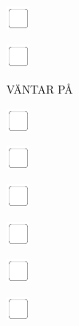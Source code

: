 \documentclass[11pt,titlepage]{article}
\begin{document}
\vspace{10mm}

\noindent
\includegraphics[]{checkbox-4mm.pdf}

\vspace{10mm}

\noindent
\includegraphics[]{checkbox-4mm.pdf}

\pagebreak

\small %
\hfill VÄNTAR PÅ

\vspace{6mm}

\noindent
\includegraphics[]{checkbox-4mm.pdf}

\vspace{10mm}

\noindent
\includegraphics[]{checkbox-4mm.pdf}

\vspace{10mm}

\noindent
\includegraphics[]{checkbox-4mm.pdf}

\vspace{10mm}

\noindent
\includegraphics[]{checkbox-4mm.pdf}

\vspace{10mm}

\noindent
\includegraphics[]{checkbox-4mm.pdf}

\vspace{10mm}

\noindent
\includegraphics[]{checkbox-4mm.pdf}
\end{document}
